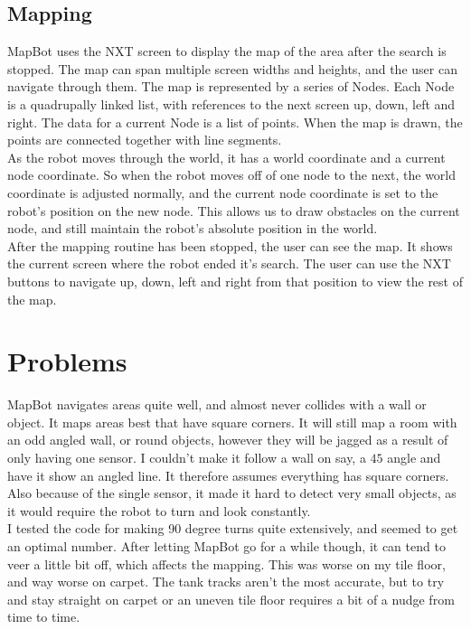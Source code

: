 \documentclass[12pt]{article}
\begin{document}
	\subsection{Mapping}

 MapBot uses the NXT screen to display the map of the area after the search is stopped. The map can span multiple screen widths and heights, and the user can navigate through them. The map is represented by a series of Nodes. Each Node is a quadrupally linked list, with references to the next screen up, down, left and right. The data for a current Node is a list of points. When the map is drawn, the points are connected together with line segments. \\

As the robot moves through the world, it has a world coordinate and a current node coordinate. So when the robot moves off of one node to the next, the world coordinate is adjusted normally, and the current node coordinate is set to the robot’s position on the new node. This allows us to draw obstacles on the current node, and still maintain the robot’s absolute position in the world.\\

After the mapping routine has been stopped, the user can see the map. It shows the current screen where the robot ended it’s search. The user can use the NXT buttons to navigate up, down, left and right from that position to view the rest of the map.

	
    \section{Problems}

MapBot navigates areas quite well, and almost never collides with a wall or object. It maps areas best that have square corners. It will still map a room with an odd angled wall, or round objects, however they will be jagged as a result of only having one sensor. I couldn’t make it follow a wall on say, a $45$\textdegree{} angle and have it show an angled line. It therefore assumes everything has square corners. Also because of the single sensor, it made it hard to detect very small objects, as it would require the robot to turn and look constantly.\\

I tested the code for making 90 degree turns quite extensively, and seemed to get an optimal number. After letting MapBot go for a while though, it can tend to veer a little bit off, which affects the mapping. This was worse on my tile floor, and way worse on carpet. The tank tracks aren’t the most accurate, but to try and stay straight on carpet or an uneven tile floor requires a bit of a nudge from time to time.
\end{document}
